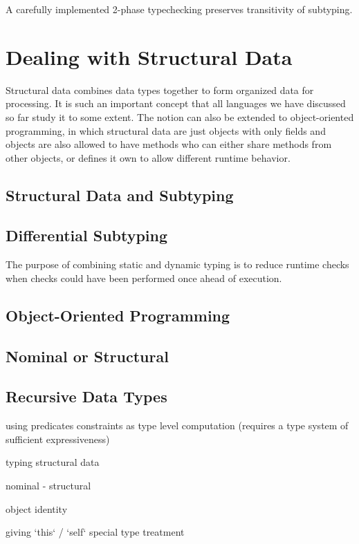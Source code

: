 A carefully implemented 2-phase typechecking preserves transitivity of subtyping.

\section{Dealing with Structural Data}

Structural data combines data types together to form organized data for processing.
It is such an important concept that all languages we have discussed so far study
it to some extent. The notion can also be extended to object-oriented programming,
in which structural data are just objects with only fields and objects are also
allowed to have methods who can either share methods from other objects,
or defines it own to allow different runtime behavior.

\subsection{Structural Data and Subtyping}

\subsection{Differential Subtyping}

The purpose of combining static and dynamic typing is to reduce
runtime checks when checks could have been performed once ahead of execution.

\subsection{Object-Oriented Programming}

\subsection{Nominal or Structural}

\subsection{Recursive Data Types}

using predicates
constraints as type level computation (requires a type system of sufficient expressiveness)

typing structural data

nominal
- structural

object identity

giving `this` / `self` special type treatment

